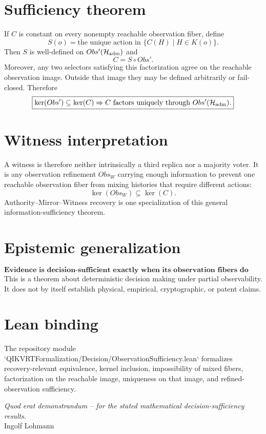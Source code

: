 \documentclass[11pt,a4paper]{article}
\begin{document}
\section*{Sufficiency theorem}
If $C$ is constant on every nonempty reachable observation fiber, define
\[
S(o)=\text{the unique action in }\{C(H)\mid H\in K(o)\}.
\]
Then $S$ is well-defined on $Obs'(\mathcal H_{\rm adm})$ and
\[
C=S\circ Obs'.
\]
Moreover, any two selectors satisfying this factorization agree on the reachable observation image. Outside that image they may be defined arbitrarily or fail-closed. Therefore
\[
\boxed{\ker(Obs')\subseteq\ker(C)\Rightarrow
C\text{ factors uniquely through }Obs'(\mathcal H_{\rm adm}).}
\]

\section*{Witness interpretation}
A witness is therefore neither intrinsically a third replica nor a majority voter. It is any observation refinement $Obs_W$ carrying enough information to prevent one reachable observation fiber from mixing histories that require different actions:
\[
\boxed{\ker(Obs_W)\subseteq\ker(C)}.
\]
Authority--Mirror--Witness recovery is one specialization of this general information-sufficiency theorem.

\section*{Epistemic generalization}
\[
\boxed{\textbf{Evidence is decision-sufficient exactly when its observation fibers do not mix the equivalence classes relevant to the correct action.}}
\]
This is a theorem about deterministic decision making under partial observability. It does not by itself establish physical, empirical, cryptographic, or patent claims.

\section*{Lean binding}
The repository module `QIKVRTFormalization/Decision/ObservationSufficiency.lean` formalizes recovery-relevant equivalence, kernel inclusion, impossibility of mixed fibers, factorization on the reachable image, uniqueness on that image, and refined-observation sufficiency.

\vfill
\begin{center}
\textit{Quod erat demonstrandum -- for the stated mathematical decision-sufficiency results.}\\
Ingolf Lohmann
\end{center}
\end{document}
